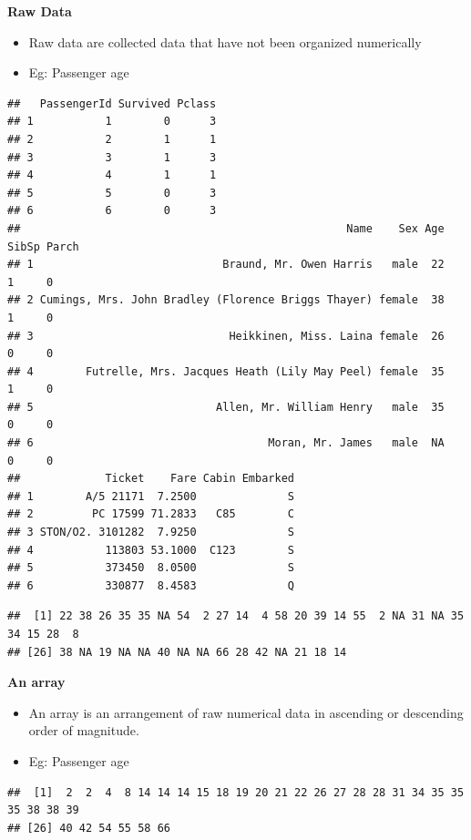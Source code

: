 \documentclass[]{book}
\providecommand{\tightlist}{%
  \setlength{\itemsep}{0pt}\setlength{\parskip}{0pt}}
\begin{document}
\textbf{Raw Data}

\begin{itemize}
\tightlist
\item
  Raw data are collected data that have not been organized numerically
\item
  Eg: Passenger age
\end{itemize}

\begin{verbatim}
##   PassengerId Survived Pclass
## 1           1        0      3
## 2           2        1      1
## 3           3        1      3
## 4           4        1      1
## 5           5        0      3
## 6           6        0      3
##                                                  Name    Sex Age SibSp Parch
## 1                             Braund, Mr. Owen Harris   male  22     1     0
## 2 Cumings, Mrs. John Bradley (Florence Briggs Thayer) female  38     1     0
## 3                              Heikkinen, Miss. Laina female  26     0     0
## 4        Futrelle, Mrs. Jacques Heath (Lily May Peel) female  35     1     0
## 5                            Allen, Mr. William Henry   male  35     0     0
## 6                                    Moran, Mr. James   male  NA     0     0
##             Ticket    Fare Cabin Embarked
## 1        A/5 21171  7.2500              S
## 2         PC 17599 71.2833   C85        C
## 3 STON/O2. 3101282  7.9250              S
## 4           113803 53.1000  C123        S
## 5           373450  8.0500              S
## 6           330877  8.4583              Q
\end{verbatim}

\begin{verbatim}
##  [1] 22 38 26 35 35 NA 54  2 27 14  4 58 20 39 14 55  2 NA 31 NA 35 34 15 28  8
## [26] 38 NA 19 NA NA 40 NA NA 66 28 42 NA 21 18 14
\end{verbatim}

\textbf{An array}

\begin{itemize}
\tightlist
\item
  An array is an arrangement of raw numerical data in ascending or descending order of magnitude.
\item
  Eg: Passenger age
\end{itemize}

\begin{verbatim}
##  [1]  2  2  4  8 14 14 14 15 18 19 20 21 22 26 27 28 28 31 34 35 35 35 38 38 39
## [26] 40 42 54 55 58 66
\end{verbatim}
\end{document}
